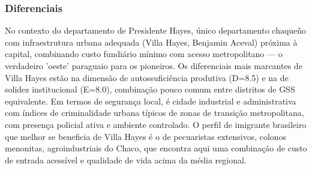 \subsubsection*{Diferenciais}\label{dif-villa-hayes-1504}
No contexto do departamento de Presidente Hayes, único departamento chaqueño com infraestrutura urbana adequada (Villa Hayes, Benjamin Aceval) próxima à capital, combinando custo fundiário mínimo com acesso metropolitano — o verdadeiro 'oeste' paraguaio para os pioneiros. Os diferenciais mais marcantes de Villa Hayes estão na dimensão de autossuficiência produtiva (D=8.5) e na de solidez institucional (E=8.0), combinação pouco comum entre distritos de GSS equivalente. Em termos de segurança local, é cidade industrial e administrativa com índices de criminalidade urbana típicos de zonas de transição metropolitana, com presença policial ativa e ambiente controlado. O perfil de imigrante brasileiro que melhor se beneficia de Villa Hayes é o de pecuaristas extensivos, colonos menonitas, agroindustriais do Chaco, que encontra aqui uma combinação de custo de entrada acessível e qualidade de vida acima da média regional.
